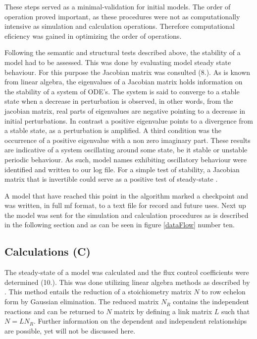 These steps served as a minimal-validation for initial models. The order of operation proved important, as these procedures were not as computationally intensive as simulation and calculation operations. Therefore computational eficiency was gained in optimizing the order of operations. 

Following the semantic and structural tests described above, the stability of a model had to be assessed. This was done by evaluating model steady state behaviour. For this purpose the Jacobian matrix was consulted (8.). As is known from linear algebra, the eigenvalues of a Jacobian matrix holds information on the stability of a system of ODE's. The system is said to converge to a stable state when a decrease in perturbation is observed, in other words, from the jacobian matrix, real parts of eigenvalues are negative pointing to a decrease in initial perturbations. In contrast a positive eigenvalue points to a divergence from a stable state, as a perturbation is amplified. A third condition was the occurrence of a positive eigenvalue with a non zero imaginary part. These results are indicative of a system oscillating around some state, be it stable or unstable periodic behaviour. As such, model names exhibiting oscillatory behaviour were identified and written to our log file. For a simple test of stability, a Jacobian matrix that is invertible could serve as a positive test of steady-state \cite{Hofmeyr2001}.  

A model that have reached this point in the algorithm marked a checkpoint and was written, in full mf format, to a text file for record and future uses. Next up the model was sent for the simulation and calculation procedures as is described in the following section and as can be seen in figure \ref{dataFlow} number ten.

\subsection{Calculations (C)} \label{Calculations}
The \gls{steady-state} of a model was calculated and the flux control coefficients were determined (10.). This was done utilizing linear algebra methods as described by \citeauthor{Hofmeyr2001}. This method entails the reduction of a stoichiometry matrix $N$ to row echelon form by Gaussian elimination. The reduced matrix $N_R$ contains the independent reactions and can be returned to $N$ matrix by defining a link matrix $L$ such that $N = LN_R$. Further information on the dependent and independent relationships are possible, yet will not be discussed here. 

